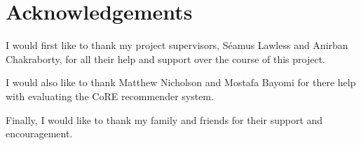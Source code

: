 \chapter*{\Huge{Acknowledgements}}

I would first like to thank my project supervisors, Séamus Lawless and Anirban Chakraborty, for all their help and support over the course of this project. 

I would also like to thank Matthew Nicholson and Mostafa Bayomi for there help with evaluating the CoRE recommender system.

Finally, I would like to thank my family and friends for their support and encouragement.